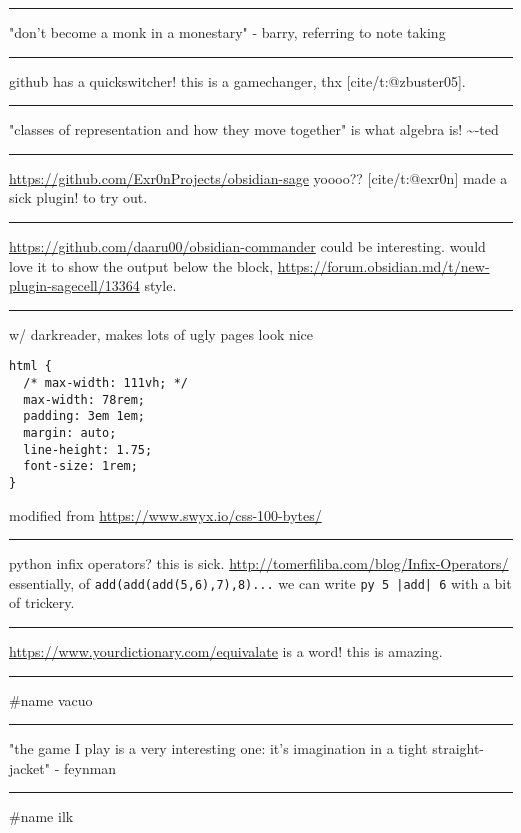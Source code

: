 \documentclass[letterpaper]{article}
\begin{document}
\noindent\rule{\textwidth}{0.5pt}

"don't become a monk in a monestary" - barry, referring to note taking

\noindent\rule{\textwidth}{0.5pt}

github has a quickswitcher! this is a gamechanger, thx
[cite/t:@zbuster05].

\noindent\rule{\textwidth}{0.5pt}

"classes of representation and how they move together" is what algebra
is! \textasciitilde{}-ted

\noindent\rule{\textwidth}{0.5pt}

\url{https://github.com/Exr0nProjects/obsidian-sage} yoooo?? [cite/t:@exr0n]
made a sick plugin! to try out.

\noindent\rule{\textwidth}{0.5pt}

\url{https://github.com/daaru00/obsidian-commander} could be interesting.
would love it to show the output below the block,
\url{https://forum.obsidian.md/t/new-plugin-sagecell/13364} style.

\noindent\rule{\textwidth}{0.5pt}

w/ darkreader, makes lots of ugly pages look nice

\begin{verbatim}
html {
  /* max-width: 111vh; */
  max-width: 78rem;
  padding: 3em 1em;
  margin: auto;
  line-height: 1.75;
  font-size: 1rem;
}
\end{verbatim}

modified from \url{https://www.swyx.io/css-100-bytes/}

\noindent\rule{\textwidth}{0.5pt}

python infix operators? this is sick.
\url{http://tomerfiliba.com/blog/Infix-Operators/} essentially, of
\texttt{add(add(add(5,6),7),8)...} we can write \texttt{py 5 |add| 6} with a bit of
trickery.

\noindent\rule{\textwidth}{0.5pt}

\url{https://www.yourdictionary.com/equivalate} is a word! this is amazing.

\noindent\rule{\textwidth}{0.5pt}

\#name vacuo

\noindent\rule{\textwidth}{0.5pt}

"the game I play is a very interesting one: it's imagination in a tight
straight-jacket" - feynman

\noindent\rule{\textwidth}{0.5pt}

\#name ilk
\end{document}
